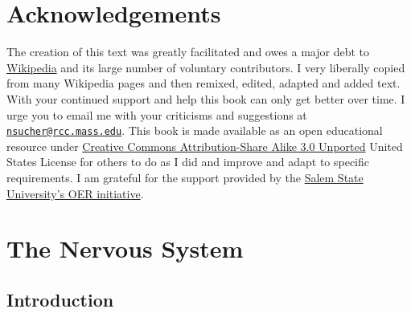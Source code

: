 




\frontmatter

\setcounter{page}{-1}


\maketitle

\setcounter{tocdepth}{1}
\tableofcontents

\clearpage

\listoffigures
\listoftables

\hypertarget{acknowledgements}{%
\chapter*{Acknowledgements}\label{acknowledgements}}

The creation of this text was greatly facilitated and owes a major debt to \href{https://www.wikipedia.org}{Wikipedia} and its large number of voluntary contributors. I very liberally copied from many Wikipedia pages and then remixed, edited, adapted and added text. With your continued support and help this book can only get better over time. I urge you to email me with your criticisms and suggestions at \href{mailto:nsucher@rcc.mass.edu}{\nolinkurl{nsucher@rcc.mass.edu}}. This book is made available as an open educational resource under \href{https://creativecommons.org/licenses/by-sa/3.0/deed.en}{Creative Commons Attribution-Share Alike 3.0 Unported} United States License for others to do as I did and improve and adapt to specific requirements. I am grateful for the support provided by the \href{}{Salem State University's OER initiative}.

\mainmatter
\hypertarget{the-nervous-system}{%
\chapter{The Nervous System}\label{the-nervous-system}}

\hypertarget{introduction}{%
\section{Introduction}\label{introduction}}

